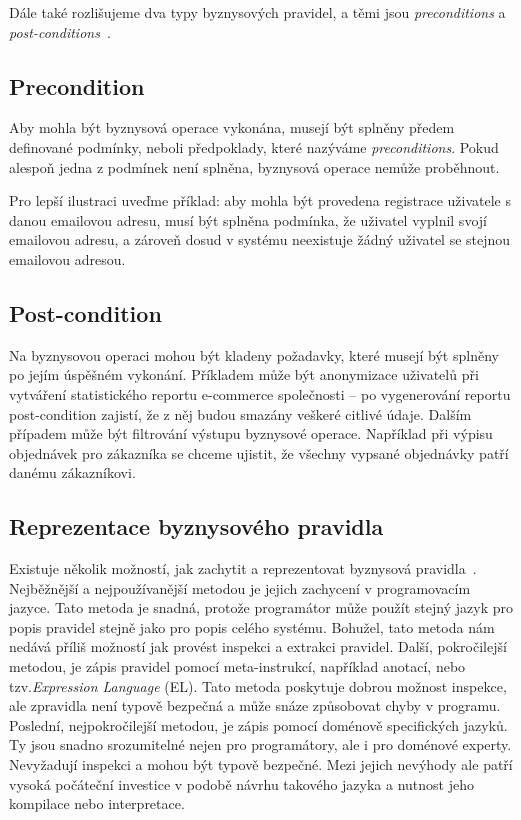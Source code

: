 Dále také rozlišujeme dva typy byznysových pravidel, a těmi jsou \textit{preconditions}
a \textit{post-conditions}~\cite{cemus2015automated}.

\subsection{Precondition}

Aby mohla být byznysová operace vykonána, musejí
být splněny předem definované podmínky, neboli předpoklady,
které nazýváme \textit{preconditions}. Pokud alespoň jedna z podmínek
není splněna, byznysová operace nemůže proběhnout.

Pro lepší ilustraci uveďme příklad: aby mohla být provedena
registrace uživatele s danou emailovou adresu, musí být splněna
podmínka, že uživatel vyplnil svojí emailovou adresu, a zároveň
dosud v systému neexistuje žádný uživatel se stejnou emailovou adresou.

\subsection{Post-condition}

Na byznysovou operaci mohou být kladeny požadavky, které
musejí být splněny po jejím úspěšném vykonání. Příkladem
může být anonymizace uživatelů při vytváření statistického
reportu e-commerce společnosti – po vygenerování reportu
post-condition zajistí, že z něj budou smazány veškeré citlivé údaje.
Dalším případem může být filtrování výstupu byznysové operace.
Například při výpisu objednávek pro zákazníka se chceme ujistit, že
všechny vypsané objednávky patří danému zákazníkovi.

\subsection{Reprezentace byznysového pravidla}

Existuje několik možností, jak zachytit a reprezentovat byznysová pravidla~\cite{cemus2015automated}.
Nejběžnější a nejpoužívanější metodou je jejich zachycení v programovacím
jazyce. Tato metoda je snadná, protože programátor může použít stejný jazyk
pro popis pravidel stejně jako pro popis celého systému. Bohužel, tato metoda
nám nedává příliš možností jak provést inspekci a extrakci pravidel.
Další, pokročilejší metodou, je zápis pravidel pomocí meta-instrukcí, například anotací,
nebo tzv.\textit{Expression Language} (\gls{EL}). Tato metoda poskytuje dobrou možnost inspekce,
ale zpravidla není typově bezpečná a může snáze způsobovat chyby v programu.
Poslední, nejpokročilejší metodou, je zápis pomocí doménově specifických jazyků.
Ty jsou snadno srozumitelné nejen pro programátory, ale i pro doménové experty.
Nevyžadují inspekci a mohou být typově bezpečné. Mezi jejich nevýhody ale patří vysoká
počáteční investice v podobě návrhu takového jazyka a nutnost jeho kompilace nebo
interpretace.

